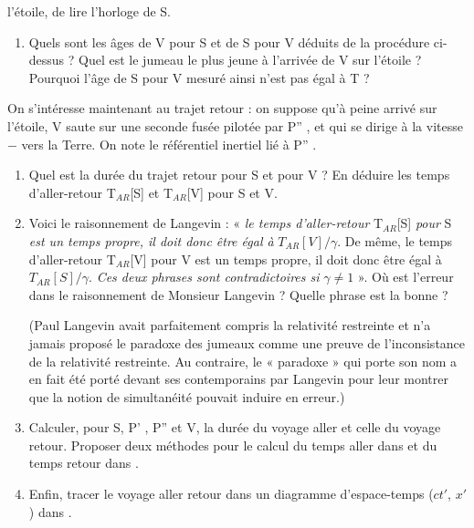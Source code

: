 l’étoile, de lire l’horloge de S.
\begin{enumerate}
  \setcounter{enumi}{\thenumero}
  \item Quels sont les âges de V pour S et de S pour V déduits de la procédure ci-dessus ? Quel
est le jumeau le plus jeune à l’arrivée de V sur l’étoile ? Pourquoi l’âge de S pour V mesuré
ainsi n’est pas égal à T ?
\setcounter{numero}{\theenumi}\end{enumerate} 
On s’intéresse maintenant au trajet retour : on suppose qu’à peine arrivé sur l’étoile, V saute
sur une seconde fusée pilotée par P'' , et qui se dirige à la vitesse $−$ vers la Terre. On note 
le référentiel inertiel lié à P'' .
\begin{enumerate}
  \setcounter{enumi}{\thenumero}
  \item Quel est la durée du trajet retour pour S et pour V ? En déduire les temps d’aller-retour
T$_{AR}$[S] et T$_{AR}$[V] pour S et V.
  \item Voici le raisonnement de Langevin : « {\it le temps d’aller-retour} T$_{AR}$[S] {\it pour} S {\it est un temps
propre, il doit donc être égal à} $T_{AR}[V]/\gamma$. De même, le temps d’aller-retour T$_{AR}$[V] pour
V est un temps propre, il doit donc être égal à $T_{AR}[S]/\gamma$. {\it Ces deux phrases sont contradictoires si} $\gamma \neq 1$ ». Où est l’erreur dans le raisonnement de Monsieur Langevin ? Quelle
phrase est la bonne ?

{\footnotesize (Paul Langevin avait parfaitement compris la relativité restreinte et n’a jamais proposé le paradoxe des jumeaux
comme une preuve de l’inconsistance de la relativité restreinte. Au contraire, le « paradoxe » qui porte son
nom a en fait été porté devant ses contemporains par Langevin pour leur montrer que la notion de simultanéité
pouvait induire en erreur.)}
  \item Calculer, pour S, P' , P'' et V, la durée du voyage aller et celle du voyage retour. Proposer
deux méthodes pour le calcul du temps aller dans  et du temps retour dans .
  \item Enfin, tracer le voyage aller retour dans un diagramme d’espace-temps ($ct'$, $x'$) dans .
\end{enumerate}
